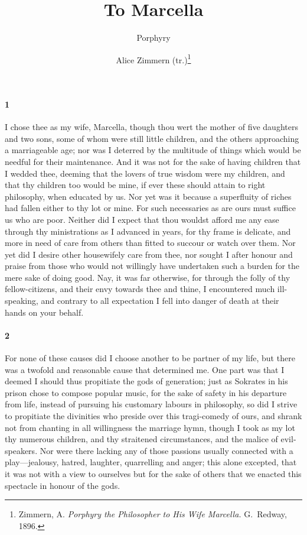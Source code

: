 \documentclass[12pt]{article}
\title{\Huge\swshape To Marcella}
\author{Porphyry \and Alice Zimmern (tr.)\footnote{Zimmern, A. \textit{Porphyry
the Philosopher to His Wife Marcella.} G.~Redway, 1896.}}
\date{}
\begin{document}
\maketitle

\paragraph{1} I chose thee as my wife, Marcella, though thou wert the mother of
five daughters and two sons, some of whom were still little children, and the
others approaching a marriageable age; nor was I deterred by the multitude of
things which would be needful for their maintenance. And it was not for the
sake of having children that I wedded thee, deeming that the lovers of true
wisdom were my children, and that thy children too would be mine, if ever these
should attain to right philosophy, when educated by us. Nor yet was it because
a superfluity of riches had fallen either to thy lot or mine. For such
necessaries as are ours must suffice us who are poor. Neither did I expect that
thou wouldst afford me any ease through thy ministrations as I advanced in
years, for thy frame is delicate, and more in need of care from others than
fitted to succour or watch over them. Nor yet did I desire other housewifely
care from thee, nor sought I after honour and praise from those who would not
willingly have undertaken such a burden for the mere sake of doing good. Nay,
it was far otherwise, for through the folly of thy fellow-citizens, and their
envy towards thee and thine, I encountered much ill-speaking, and contrary to
all expectation I fell into danger of death at their hands on your behalf.

\paragraph{2} For none of these causes did I choose another to be partner of my
life, but there was a twofold and reasonable cause that determined me. One part
was that I deemed I should thus propitiate the gods of generation; just as
Sokrates in his prison chose to compose popular music, for the sake of safety
in his departure from life, instead of pursuing his customary labours in
philosophy, so did I strive to propitiate the divinities who preside over this
tragi-comedy of ours, and shrank not from chanting in all willingness the
marriage hymn, though I took as my lot thy numerous children, and thy
straitened circumstances, and the malice of evil-speakers. Nor were there
lacking any of those passions usually connected with a play---jealousy, hatred,
laughter, quarrelling and anger; this alone excepted, that it was not with a
view to ourselves but for the sake of others that we enacted this spectacle in
honour of the gods.
\end{document}
